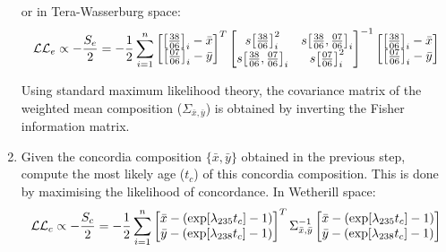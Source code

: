 \begin{refsection}
\begin{enumerate}
    or in Tera-Wasserburg space:
        \begin{equation}
    \mathcal{LL}_e \propto - \frac{S_e}{2} =
      -\frac{1}{2}\sum\limits_{i=1}^{n}
    \left[
      \begin{array}{@{}c@{}}
        \left[\frac{38}{06}\right]_i-\bar{x}\\
        \left[\frac{07}{06}\right]_i-\bar{y}
      \end{array}
      \right]^T
    \left[
      \begin{array}{@{}cc@{}}
        s\!\left[\frac{38}{06}\right]_i^2 &
        s\!\left[\frac{38}{06},\frac{07}{06}\right]_i\\
        s\!\left[\frac{38}{06},\frac{07}{06}\right]_i &
        s\!\left[\frac{07}{06}\right]_i^2
      \end{array}
      \right]^{-1}
    \left[
      \begin{array}{@{}c@{}}
        \left[\frac{38}{06}\right]_i-\bar{x}\\
        \left[\frac{07}{06}\right]_i-\bar{y}
      \end{array}
      \right]    
    \end{equation}

    Using standard maximum likelihood theory, the covariance matrix of
    the weighted mean composition ($\Sigma_{\bar{x},\bar{y}}$) is
    obtained by inverting the Fisher information matrix.
    
  \item Given the concordia composition $\{\bar{x},\bar{y}\}$ obtained
    in the previous step, compute the most likely age ($t_c$) of this
    concordia composition. This is done by maximising the likelihood
    of concordance. In Wetherill space:
        \begin{equation}
    \mathcal{LL}_c \propto - \frac{S_c}{2} =
      -\frac{1}{2}\sum\limits_{i=1}^{n}
    \left[
      \begin{array}{@{}c@{}}
        \bar{x} - (\exp[\lambda_{235}t_c] - 1)\\
        \bar{y} - (\exp[\lambda_{238}t_c] - 1)
      \end{array}
      \right]^T
    \Sigma_{\bar{x},\bar{y}}^{-1}
    \left[
      \begin{array}{@{}c@{}}
        \bar{x} - (\exp[\lambda_{235}t_c] - 1)\\
        \bar{y} - (\exp[\lambda_{238}t_c] - 1)
      \end{array}
      \right]
    \label{eq:concordiaAgeWetherill}
    \end{equation}


\end{enumerate}
\end{refsection}
